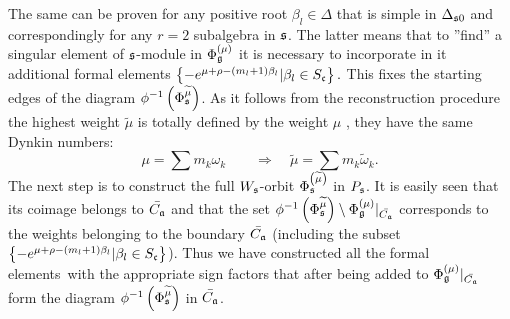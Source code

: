 The same can be proven for any positive root $\beta _{l}\in \Delta $ that is
simple in $\Delta _{\frak{s}0}$ and correspondingly for any $r=2$ subalgebra
in $\frak{s}$. The latter means that to ''find'' a singular element of $%
\frak{s}$-module in $\Phi _{\mathfrak{g}}^{\left( \mu \right) }$ it is necessary
to incorporate in it additional formal elements $\left\{ -e^{\mu +\rho
-\left( m_{l}+1\right) \beta _{l}}|\beta _{l}\in S_{\frak{c}}\right\}.$ This
fixes the starting edges of the diagram $\phi ^{-1}\left( \Phi _{\frak{s}}^{%
\widetilde{\mu }}\right) $. As it follows from the reconstruction procedure
the highest weight $\widetilde{\mu }$ is totally defined by the weight $\mu $%
, they have the same Dynkin numbers:
\begin{equation}
\mu =\sum m_{k}\omega _{k}\qquad \Longrightarrow \quad \widetilde{\mu }=\sum
m_{k}\widetilde{\omega }_{k} . \label{new h weight}
\end{equation}
The next step is to construct the full $W_{\frak{s}}$-orbit $\Phi _{\frak{s}%
}^{\left( \widetilde{\mu }\right) }$  in $P_{\frak{s}}$. It is easily seen
that its coimage belongs to $\bar{C_{\mathfrak{a}}}$ and that the set $\phi
^{-1}\left( \Phi _{\frak{s}}^{\widetilde{\mu }}\right) \setminus \Phi _{%
\gf}^{\left( \mu \right) }|_{\bar{C_{\af}}}$ corresponds to the
weights belonging to the boundary $\bar{C_{\mathfrak{a}}}$ (including the subset
$\left\{ -e^{\mu +\rho -\left( m_{l}+1\right) \beta _{l}}|\beta _{l}\in S_{%
\frak{c}}\right\} $). Thus we have constructed all the formal elements\ with
the appropriate sign factors that after being added to $\Phi _{\gf%
}^{\left( \mu \right) }|_{\bar{C_{\af}}}$ form the diagram $\phi
^{-1}\left( \Phi _{\frak{s}}^{\widetilde{\mu }}\right) $ in $\bar{C_{\af%
}}$.

